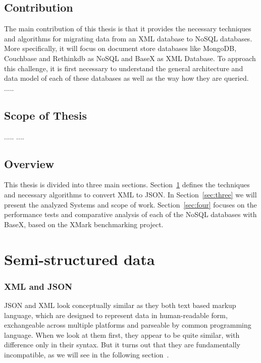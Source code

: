 \documentclass[a4paper,12pt]{article}
\begin{document}
	\subsection{Contribution}
		The main contribution of this thesis is that it provides the necessary techniques and algorithms for migrating data from an XML database to NoSQL databases.  More specifically, it will focus on document store databases like MongoDB, Couchbase and Rethinkdb as NoSQL and BaseX as XML Database. To approach this challenge, it is first necessary to understand the general architecture and data model of each of these databases as well as the way how they are queried.
		.....
		
	\subsection{Scope of Thesis}
	.....
	....
	\subsection{Overview}
		This thesis is divided into three main sections. Section~\ref{sec:two} defines the techniques and necessary algorithms to convert XML  to JSON. In Section~\ref{sec:three} we will present the analyzed Systems and scope of work. Section~\ref{sec:four} focuses on the performance tests and comparative analysis of each of the NoSQL databases with BaseX, based on the XMark benchmarking project.
		
		
	\newpage
	\section{Semi-structured data}
	\label{sec:two}

		\subsubsection{XML and JSON}
			JSON and XML look conceptually similar as they both text based markup language, which are designed to represent data in human-readable form, exchangeable across multiple platforms and parseable by common programming language. When we look at them first, they appear to be quite similar, with difference only in their syntax. But it turns out that they are fundamentally incompatible, as we will see in the following section~\cite{lee2011jxon}.
\end{document}
